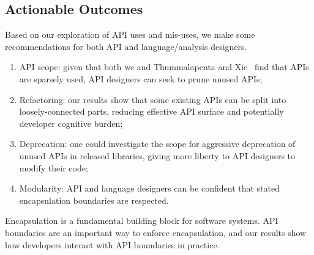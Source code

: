 \subsection{Actionable Outcomes}
Based on our exploration of API uses and mis-uses, we make some recommendations
for both API and language/analysis designers.

\begin{enumerate}
\item API scope: given that both we and Thummalapenta and Xie~\cite{thummalapenta08:_spotw} find
that APIs are sparsely used, API designers can seek to prune unused APIs;
\item Refactoring: our results show that some existing APIs can be split into loosely-connected parts, reducing effective API surface and potentially developer cognitive burden;
\item Deprecation: one could investigate the scope for aggressive deprecation of unused APIs in released libraries, giving more liberty to API designers to modify their code;
\item Modularity: API and language designers can be confident that stated encapsulation boundaries are respected.
\end{enumerate}
Encapsulation is a fundamental building block for software systems. API boundaries are an important way to enforce encapsulation, and our results show how developers interact with API boundaries in practice.




